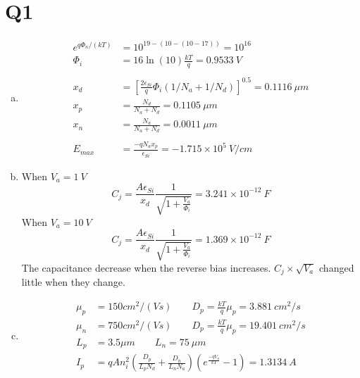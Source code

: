 \documentclass{article}
\begin{document}
\section*{Q1}
\begin{enumerate}[(a)]
	\item 
	\begin{align*}
	e^{q\Phi_n/(kT)}&=10^{19-(10-(10-17))}=10^{16}\\
	\Phi_i &= 16\ln(10)\frac{kT}{q}=0.9533\ V\\\\
	x_d &= [\frac{2\epsilon_{Si}}{q}\Phi_i(1/N_a+1/N_d) ]^{0.5}=0.1116\ \mu m\\
	x_p &= \frac{N_d}{N_a+N_d}=0.1105\ \mu m\\
	x_n &= \frac{N_a}{N_a+N_d}=0.0011\ \mu m\\\\
	E_{max} &=\frac{-qN_ax_p}{\epsilon_{Si}}=-1.715\times 10^5\ V/cm
	\end{align*}
	\item 
	When $V_a = 1\ V$
	$$C_j=\frac{A\epsilon_{Si}}{x_d}\frac{1}{\sqrt{1+\frac{V_a}{\Phi_i}}}=3.241\times 10^{-12}\ F$$
	When $V_a = 10\ V$
	$$C_j=\frac{A\epsilon_{Si}}{x_d}\frac{1}{\sqrt{1+\frac{V_a}{\Phi_i}}}=1.369\times 10^{-12}\ F$$
	The capacitance decrease when the reverse bias increases. $C_j\times\sqrt{V_a}$ changed little when they change.
	\item 
	\begin{align*}
	\mu_p &= 150cm^2/(Vs)\qquad D_p=\frac{kT}{q}\mu_p=3.881\ cm^2/s\\
	\mu_n &= 750cm^2/(Vs)\qquad D_p=\frac{kT}{q}\mu_p=19.401\ cm^2/s\\
	L_p&=3.5\mu m\qquad L_n=75\ \mu m\\
	I_p&=qAn_i^2(\frac{D_p}{L_pN_d}+\frac{D_n}{L_nN_a})(e^\frac{-qV_a}{kT}-1)=1.3134\ A
	\end{align*}
\end{enumerate}
\newpage
\end{document}
